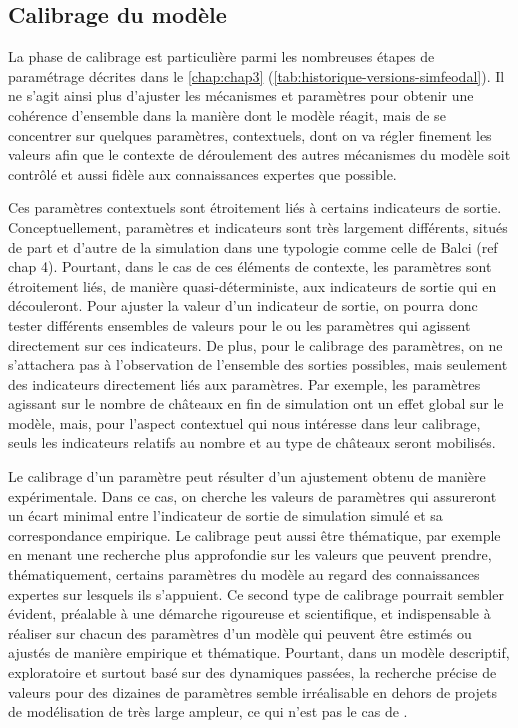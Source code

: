 \subsection{Calibrage du modèle \label{subsec:calibrage}}

La phase de calibrage est particulière parmi les nombreuses étapes de paramétrage décrites dans le \cref{chap:chap3} (\cref{tab:historique-versions-simfeodal}).
Il ne s'agit ainsi plus d'ajuster les mécanismes et paramètres pour obtenir une cohérence d'ensemble dans la manière dont le modèle réagit, mais de se concentrer sur quelques paramètres, contextuels, dont on va régler finement les valeurs afin que le contexte de déroulement des autres mécanismes du modèle soit contrôlé et aussi fidèle aux connaissances expertes que possible.

Ces paramètres contextuels sont étroitement liés à certains indicateurs de sortie.
Conceptuellement, paramètres et indicateurs sont très largement différents, situés de part et d'autre de la simulation dans une typologie comme celle de Balci (ref chap 4).
Pourtant, dans le cas de ces éléments de contexte, les paramètres sont étroitement liés, de manière quasi-déterministe, aux indicateurs de sortie qui en découleront.
Pour \og ajuster\fg{} la valeur d'un indicateur de sortie, on pourra donc tester différents ensembles de valeurs pour le ou les paramètres qui agissent directement sur ces indicateurs.
De plus, pour le calibrage des paramètres, on ne s'attachera pas à l'observation de l'ensemble des sorties possibles, mais seulement des indicateurs directement liés aux paramètres.
Par exemple, les paramètres agissant sur le nombre de châteaux en fin de simulation ont un effet global sur le modèle, mais, pour l'aspect contextuel qui nous intéresse dans leur calibrage, seuls les indicateurs relatifs au nombre et au type de châteaux seront mobilisés.

Le calibrage d'un paramètre peut résulter d'un ajustement obtenu de manière expérimentale.
Dans ce cas, on cherche les valeurs de paramètres qui assureront un écart minimal entre l'indicateur de sortie de simulation simulé et sa correspondance empirique.
Le calibrage peut aussi être thématique, par exemple en menant une recherche plus approfondie sur les valeurs que peuvent prendre, thématiquement, certains paramètres du modèle au regard des connaissances expertes sur lesquels ils s'appuient.
Ce second type de calibrage pourrait sembler évident, préalable à une démarche rigoureuse et scientifique, et indispensable à réaliser sur chacun des paramètres d'un modèle qui peuvent être estimés ou ajustés de manière empirique et thématique.
Pourtant, dans un modèle descriptif, exploratoire et surtout basé sur des dynamiques passées, la recherche précise de valeurs pour des dizaines de paramètres semble irréalisable en dehors de projets de modélisation de très large ampleur, ce qui n'est pas le cas de \simfeodal{}.

